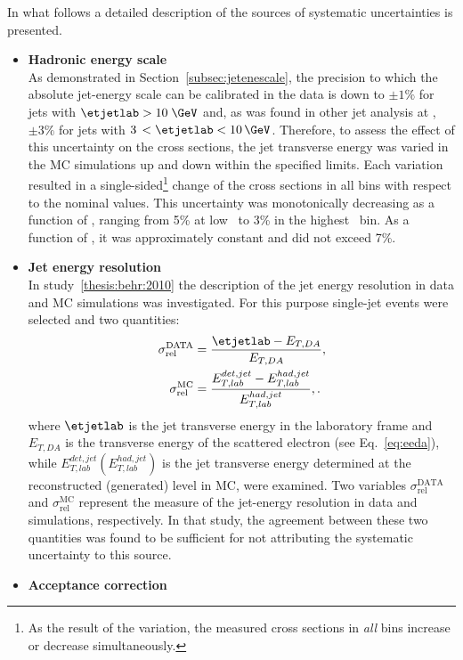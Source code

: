 In what follows a detailed description of the sources of systematic uncertainties is presented.
\begin{itemize}
	\item \textbf{Hadronic energy scale} \\
		As demonstrated in Section~\ref{subsec:jetenescale}, the precision to which the absolute jet-energy scale can be calibrated in the data is down to $\pm1\%$ for jets with $\etjetlab > 10\;\GeV$ and, as was found in other jet analysis at \zeus, $\pm3\%$ for jets with $3\,< \etjetlab < 10\,\GeV$. Therefore, to assess the effect of this uncertainty on the cross sections, the jet transverse energy was varied in the MC simulations up and down within the specified limits. Each variation resulted in a single-sided\footnote{As the result of the variation, the measured cross sections in \textit{all} bins increase or decrease simultaneously.} change of the cross sections in all bins with respect to the nominal values. This uncertainty was monotonically decreasing as a function of \qsq, ranging from 5\% at low \qsq~to 3\% in the highest \qsq~bin. As a function of \etjetb, it was approximately constant and did not exceed 7\%.
 \item \textbf{Jet energy resolution} \\
     In study~\ref{thesis:behr:2010} the description of the jet energy resolution in data and MC simulations was investigated. For this purpose single-jet events were selected and two quantities:
		\begin{align}
		\sigma_\mathrm{rel}^\mathrm{DATA} &= \frac{\etjetlab-E_{T,DA}}{E_{T,DA}},\label{eq:dataetres}\\
		\sigma_\mathrm{rel}^\mathrm{MC} &= \frac{E_{T,lab}^{det,jet}-E_{T,lab}^{had,jet}}{E_{T,lab}^{had,jet}},\label{eq:mcetres}.
		\end{align}
		where $\etjetlab$ is the jet transverse energy in the laboratory frame and $E_{T,DA}$ is the transverse energy of the scattered electron (see Eq.~\eqref{eq:eeda}), while $E_{T,lab}^{det,jet}(E_{T,lab}^{had,jet})$ is the jet transverse energy determined at the reconstructed (generated) level in MC, were examined. Two variables $\sigma_\mathrm{rel}^\mathrm{DATA}$ and $\sigma_\mathrm{rel}^\mathrm{MC}$ represent the measure of the jet-energy resolution in data and simulations, respectively. In that study, the agreement between these two quantities was found to be sufficient for not attributing the systematic uncertainty to this source.
	\item \textbf{Acceptance correction} \\

\end{itemize}

